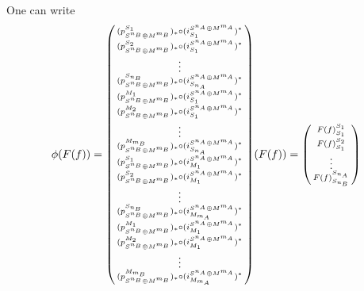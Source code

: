 \begin{remark}
    One can write
    \[
        \phi \tuple{F(f)}
        =
        \begin{psmallmatrix}
            \tuple{ p_{S^{n_B} \oplus M^{m_B}}^{S_1} }_* \circ \tuple{ i_{S_1}^{S^{n_A} \oplus M^{m_A}} }^* \\
            \tuple{ p_{S^{n_B} \oplus M^{m_B}}^{S_2} }_* \circ \tuple{ i_{S_1}^{S^{n_A} \oplus M^{m_A}} }^* \\
            \vdots \\
            \tuple{ p_{S^{n_B} \oplus M^{m_B}}^{S_{n_B}} }_* \circ \tuple{ i_{S_{n_A}}^{S^{n_A} \oplus M^{m_A}} }^* \\
            \tuple{ p_{S^{n_B} \oplus M^{m_B}}^{M_1} }_* \circ \tuple{ i_{S_1}^{S^{n_A} \oplus M^{m_A}} }^* \\
            \tuple{ p_{S^{n_B} \oplus M^{m_B}}^{M_2} }_* \circ \tuple{ i_{S_1}^{S^{n_A} \oplus M^{m_A}} }^* \\
            \vdots \\
            \tuple{ p_{S^{n_B} \oplus M^{m_B}}^{M_{m_B}} }_* \circ \tuple{ i_{S_{n_A}}^{S^{n_A} \oplus M^{m_A}} }^* \\
            \tuple{ p_{S^{n_B} \oplus M^{m_B}}^{S_1} }_* \circ \tuple{ i_{M_1}^{S^{n_A} \oplus M^{m_A}} }^* \\
            \tuple{ p_{S^{n_B} \oplus M^{m_B}}^{S_2} }_* \circ \tuple{ i_{M_1}^{S^{n_A} \oplus M^{m_A}} }^* \\
            \vdots \\
            \tuple{ p_{S^{n_B} \oplus M^{m_B}}^{S_{n_B}} }_* \circ \tuple{ i_{M_{m_A}}^{S^{n_A} \oplus M^{m_A}} }^* \\
            \tuple{ p_{S^{n_B} \oplus M^{m_B}}^{M_1} }_* \circ \tuple{ i_{M_1}^{S^{n_A} \oplus M^{m_A}} }^* \\
            \tuple{ p_{S^{n_B} \oplus M^{m_B}}^{M_2} }_* \circ \tuple{ i_{M_1}^{S^{n_A} \oplus M^{m_A}} }^* \\
            \vdots \\
            \tuple{ p_{S^{n_B} \oplus M^{m_B}}^{M_{m_B}} }_* \circ \tuple{ i_{M_{m_A}}^{S^{n_A} \oplus M^{m_A}} }^*
        \end{psmallmatrix}
        \tuple{F(f)}
        =
        \begin{psmallmatrix}
            F(f)_{S_1}^{S_1} \\
            F(f)_{S_1}^{S_2} \\
            \vdots \\
            F(f)_{S_{n_B}}^{S_{n_A}} \\

\end{psmallmatrix}\]
\end{remark}
